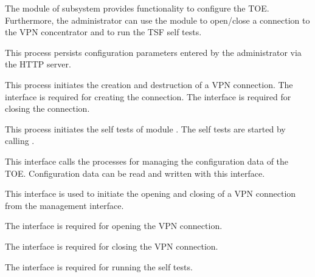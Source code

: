



The module  of subsystem 
provides functionality to configure the TOE. Furthermore, the administrator can
use the module to open/close a connection to the VPN concentrator and to run the
TSF self tests.



This process persists configuration parameters entered by the administrator via
the HTTP server.


This process initiates the creation and destruction of a VPN connection. The
interface  is required for creating the
connection. The interface  is required for
closing the connection.


This process initiates the self tests of module
. The self tests are started by calling
.



This interface calls the processes for managing the configuration data of the
TOE. Configuration data can be read and written with this interface.


This interface is used to initiate the opening and closing of a VPN connection
from the management interface.


The interface  is required for opening the VPN
connection.


The interface is required for closing the
VPN connection.


The interface is required  for
running the self tests.






